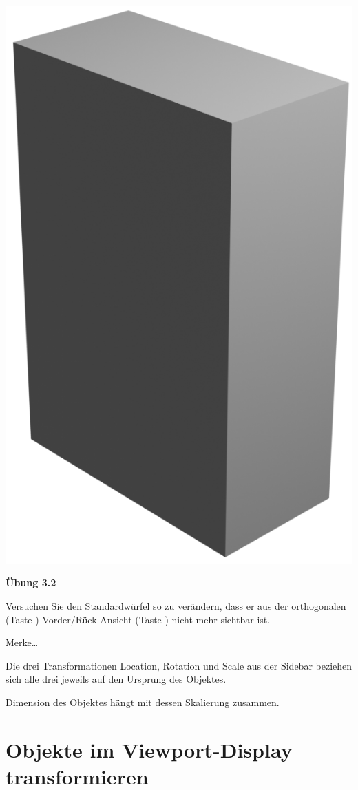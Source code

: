 \documentclass[
]{book}
\newcommand{\kbd}[1]{\fbox{\texttt{#1}}}
\begin{document}
\includegraphics{Chapters/Images/Chapter_7/Exercise_3_1.png}

\textbf{Übung 3.2}

Versuchen Sie den Standardwürfel so zu verändern, dass er aus der
orthogonalen (Taste \kbd{5} ) Vorder/Rück-Ansicht (Taste \kbd{1} ) nicht
mehr sichtbar ist.

Merke\ldots{}

Die drei Transformationen Location, Rotation und Scale aus der Sidebar
beziehen sich alle drei jeweils auf den Ursprung des Objektes.

Dimension des Objektes hängt mit dessen Skalierung zusammen.

\chapter{Objekte im Viewport-Display
transformieren}\label{objekte-im-viewport-display-transformieren}
\end{document}
